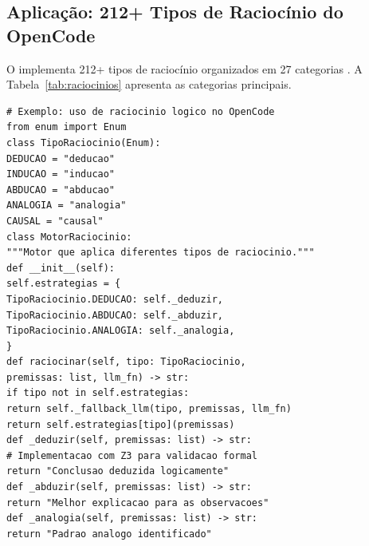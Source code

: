 \subsection{Aplicação: 212+ Tipos de Raciocínio do OpenCode}
O \opencodeeco{} implementa 212+ tipos de raciocínio organizados em 27
categorias \cite{opencode2026ecosystem}. A Tabela~\ref{tab:raciocinios}
apresenta as categorias principais.
\begin{table}[htb]
\centering
    \small
\caption{Categorias de raciocínio do OpenCode Ecosystem}
\label{tab:raciocinios}
\end{table}
\begin{lstlisting}[style=pythonstyle]
# Exemplo: uso de raciocinio logico no OpenCode
from enum import Enum
class TipoRaciocinio(Enum):
DEDUCAO = "deducao"
INDUCAO = "inducao"
ABDUCAO = "abducao"
ANALOGIA = "analogia"
CAUSAL = "causal"
class MotorRaciocinio:
"""Motor que aplica diferentes tipos de raciocinio."""
def __init__(self):
self.estrategias = {
TipoRaciocinio.DEDUCAO: self._deduzir,
TipoRaciocinio.ABDUCAO: self._abduzir,
TipoRaciocinio.ANALOGIA: self._analogia,
}
def raciocinar(self, tipo: TipoRaciocinio,
premissas: list, llm_fn) -> str:
if tipo not in self.estrategias:
return self._fallback_llm(tipo, premissas, llm_fn)
return self.estrategias[tipo](premissas)
def _deduzir(self, premissas: list) -> str:
# Implementacao com Z3 para validacao formal
return "Conclusao deduzida logicamente"
def _abduzir(self, premissas: list) -> str:
return "Melhor explicacao para as observacoes"
def _analogia(self, premissas: list) -> str:
return "Padrao analogo identificado"
\end{lstlisting}
